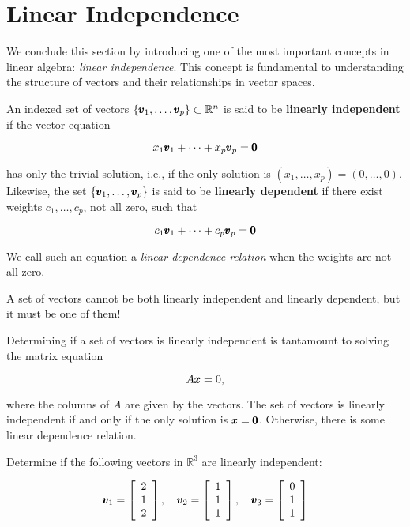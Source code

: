 \section{Linear Independence}
We conclude this section by introducing one of the most important concepts in linear algebra: \textit{linear independence}. This concept is fundamental to understanding the structure of vectors and their relationships in vector spaces.

\begin{definition}
    An indexed set of vectors $\left\{\pmb{v}_1, \ldots, \pmb{v}_p\right\} \subset \mathbb{R}^n$ is said to be \textbf{linearly independent} if the vector equation
    
    \[
    x_1 \pmb{v}_1 + \cdots + x_p \pmb{v}_p = \pmb{0}
    \]
    
    has only the trivial solution, i.e., if the only solution is $\left(x_1, \ldots, x_p\right) = (0, \ldots, 0)$. Likewise, the set $\left\{\pmb{v}_1, \ldots, \pmb{v}_p\right\}$ is said to be \textbf{linearly dependent} if there exist weights $c_1, \ldots, c_p$, not all zero, such that
    
    \[
    c_1 \pmb{v}_1 + \cdots + c_p \pmb{v}_p = \pmb{0}
    \]
    
    We call such an equation a \textit{linear dependence relation} when the weights are not all zero.
    \end{definition}
    
    \begin{remark}
        A set of vectors cannot be both linearly independent and linearly dependent, but it must be one of them!
    \end{remark}

    Determining if a set of vectors is linearly independent is tantamount to solving the matrix equation

    \[
    A \pmb{x}=0,
    \]

where the columns of $A$ are given by the vectors. The set of vectors is linearly independent if and only if the only solution is $\pmb{x}=\pmb{0}$. Otherwise, there is some linear dependence relation.

    \begin{example}
        Determine if the following vectors in $\mathbb{R}^3$ are linearly independent:

        \[
        \pmb{v}_1 = \left[\begin{array}{l}
        2 \\
        1 \\
        2
        \end{array}\right], \quad \pmb{v}_2 = \left[\begin{array}{l}
        1 \\
        1 \\
        1
        \end{array}\right], \quad \pmb{v}_3 = \left[\begin{array}{l}
        0 \\
        1 \\
        1
        \end{array}\right]
        \]
    \end{example}

